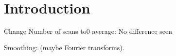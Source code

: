 \documentclass{article}
\begin{document}
\section{Introduction}

Change Number of scans to0 average: No difference seen

Smoothing: (maybe Fourier transforms).
\end{document}
